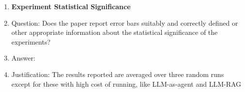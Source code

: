 \begin{enumerate}
\item {\bf Experiment Statistical Significance}
    \item[] Question: Does the paper report error bars suitably and correctly defined or other appropriate information about the statistical significance of the experiments?
    \item[] Answer: \answerYes{} %
    \item[] Justification: The results reported are averaged over three random runs except for these with high cost of running, like LLM-as-agent and LLM-RAG


\end{enumerate}
